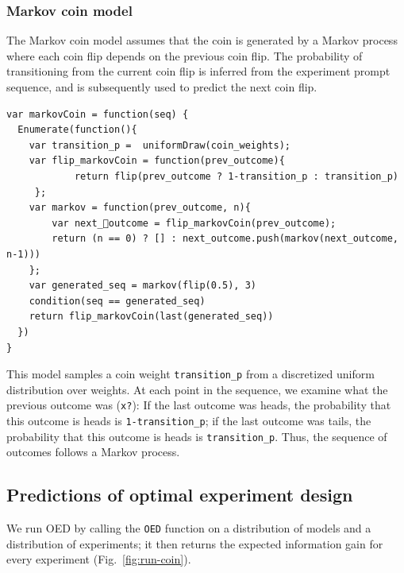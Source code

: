 \documentclass{article}
\begin{document}
\subsubsection{Markov coin model}
\label{s:tutorial:sss:markov}
The Markov coin model assumes that the coin is generated by a Markov process where each coin flip depends on the previous coin flip. The probability of transitioning from the current coin flip is inferred from the experiment prompt sequence, and is subsequently used to predict the next coin flip.
%
%
\begin{lstlisting}[caption=Markov coin model]
var markovCoin = function(seq) {
  Enumerate(function(){
    var transition_p =  uniformDraw(coin_weights);
    var flip_markovCoin = function(prev_outcome){
    		return flip(prev_outcome ? 1-transition_p : transition_p)
	 };
 	var markov = function(prev_outcome, n){
		var next_outcome = flip_markovCoin(prev_outcome);
		return (n == 0) ? [] : next_outcome.push(markov(next_outcome, n-1)))
	};
	var generated_seq = markov(flip(0.5), 3)
    condition(seq == generated_seq)
    return flip_markovCoin(last(generated_seq))
  })
}
\end{lstlisting}
%
This model samples a coin weight \lstinline{transition_p} from a discretized uniform distribution over weights.
At each point in the sequence, we examine what the previous outcome was (\lstinline{x?}): If the last outcome was heads, the probability that this outcome is heads is \lstinline{1-transition_p}; if the last outcome was tails, the probability that this outcome is heads is \lstinline{transition_p}. Thus, the sequence of outcomes follows a Markov process.

\subsection{Predictions of optimal experiment design}

We run OED by calling the \lstinline{OED} function on a distribution of models and a distribution of experiments; it then returns the expected information gain for every experiment (Fig.~\ref{fig:run-coin}).
\end{document}
